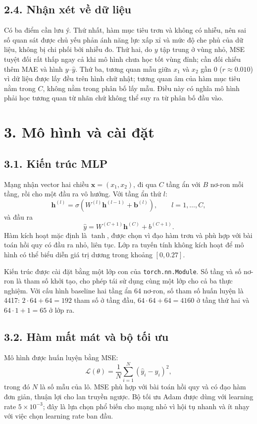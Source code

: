 \documentclass[12pt,a4paper]{article}
\begin{document}
\subsection{2.4. Nhận xét về dữ liệu}

Có ba điểm cần lưu ý. Thứ nhất, hàm mục tiêu trơn và không có nhiễu, nên sai số quan sát được chủ yếu phản ánh năng lực xấp xỉ và mức độ che phủ của dữ liệu, không bị chi phối bởi nhiễu đo. Thứ hai, do $y$ tập trung ở vùng nhỏ, MSE tuyệt đối rất thấp ngay cả khi mô hình chưa học tốt vùng đỉnh; cần đối chiếu thêm MAE và hình $y$–$\hat{y}$. Thứ ba, tương quan mẫu giữa $x_1$ và $x_2$ gần 0 ($r \approx 0.010$) vì dữ liệu được lấy đều trên hình chữ nhật; tương quan âm của hàm mục tiêu nằm trong $C$, không nằm trong phân bố lấy mẫu. Điều này có nghĩa mô hình phải học tương quan từ nhãn chứ không thể suy ra từ phân bố đầu vào.

\section{3. Mô hình và cài đặt}

\subsection{3.1. Kiến trúc MLP}

Mạng nhận vector hai chiều $\mathbf{x} = (x_1, x_2)$, đi qua $C$ tầng ẩn với $B$ nơ-ron mỗi tầng, rồi cho một đầu ra vô hướng. Với tầng ẩn thứ $l$:
$$\mathbf{h}^{(l)} = \sigma\left(W^{(l)}\mathbf{h}^{(l-1)} + \mathbf{b}^{(l)}\right), \qquad l = 1, \ldots, C,$$
và đầu ra
$$\hat{y} = W^{(C+1)}\mathbf{h}^{(C)} + b^{(C+1)}.$$
Hàm kích hoạt mặc định là $\tanh$, được chọn vì đạo hàm trơn và phù hợp với bài toán hồi quy có đầu ra nhỏ, liên tục. Lớp ra tuyến tính không kích hoạt để mô hình có thể biểu diễn giá trị dương trong khoảng $[0, 0.27]$.

Kiến trúc được cài đặt bằng một lớp con của \texttt{torch.nn.Module}. Số tầng và số nơ-ron là tham số khởi tạo, cho phép tái sử dụng cùng một lớp cho cả ba thực nghiệm. Với cấu hình baseline hai tầng ẩn 64 nơ-ron, số tham số huấn luyện là 4417: $2\cdot64+64 = 192$ tham số ở tầng đầu, $64\cdot64+64 = 4160$ ở tầng thứ hai và $64\cdot1+1 = 65$ ở lớp ra.

\subsection{3.2. Hàm mất mát và bộ tối ưu}

Mô hình được huấn luyện bằng MSE:
$$\mathcal{L}(\theta) = \frac{1}{N}\sum_{i=1}^{N}\left(\hat{y}_i - y_i\right)^2,$$
trong đó $N$ là số mẫu của lô. MSE phù hợp với bài toán hồi quy và có đạo hàm đơn giản, thuận lợi cho lan truyền ngược. Bộ tối ưu Adam được dùng với learning rate $5\times10^{-3}$; đây là lựa chọn phổ biến cho mạng nhỏ vì hội tụ nhanh và ít nhạy với việc chọn learning rate ban đầu.
\end{document}
